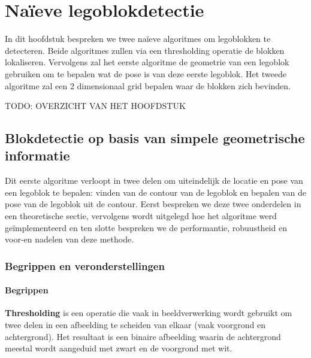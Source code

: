 \chapter{Na\"ieve legoblokdetectie}
\label{hoofdstuk:2}
In dit hoofdstuk bespreken we twee na\"ieve algoritmes om legoblokken te detecteren. Beide algoritmes zullen via een thresholding operatie de blokken lokaliseren. Vervolgens zal het eerste algoritme de geometrie van een legoblok gebruiken om te bepalen wat de pose is van deze eerste legoblok. Het tweede algoritme zal een 2 dimensionaal grid bepalen waar de blokken zich bevinden.

TODO: OVERZICHT VAN HET HOOFDSTUK

\section{Blokdetectie op basis van simpele geometrische informatie}
Dit eerste algoritme verloopt in twee delen om uiteindelijk de locatie en pose van een legoblok te bepalen: vinden van de contour van de legoblok en bepalen van de pose van de legoblok uit de contour. Eerst bespreken we deze twee onderdelen in een theoretische sectie, vervolgens wordt uitgelegd hoe het algoritme werd ge\"implementeerd en ten slotte bespreken we de performantie, robuustheid en voor-en nadelen van deze methode.

\subsection{Begrippen en veronderstellingen}

\subsubsection*{Begrippen}

\textbf{Thresholding} is een operatie die vaak in beeldverwerking wordt gebruikt om twee delen in een afbeelding te scheiden van elkaar (vaak voorgrond en achtergrond). Het resultaat is een binaire afbeelding waarin de achtergrond meestal wordt aangeduid met zwart en de voorgrond met wit.

